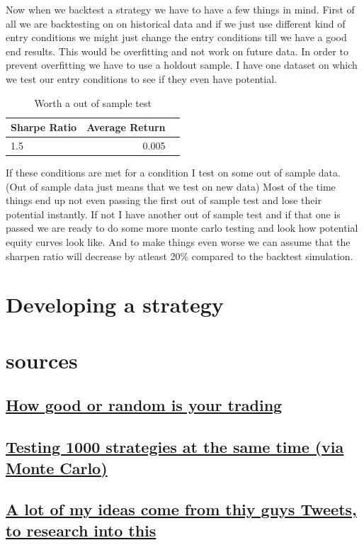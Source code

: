 \documentclass[12pt]{article}
\begin{document}
Now when we backtest a strategy we have to have a few things in mind. First of all we are backtesting on on historical data and if we just use different kind of entry conditions we might just change the entry conditions till we have a good end results. This would be overfitting and not work on future data. 
In order to prevent overfitting we have to use a holdout sample. I have one dataset on which we test our entry conditions to see if they even have potential. 



\begin{table}[H]
  \centering
  \caption{Worth a out of sample test}
  \label{tab:strategy_results}
  \begin{tabular}{@{}lrr@{}}
    \toprule
      Sharpe Ratio &  Average Return  \\
    \midrule
      1.5 & 0.005 \\
    \bottomrule
  \end{tabular}
\end{table}

If these conditions are met for a condition I test on some out of sample data. (Out of sample data just means that we test on new data)
Most of the time things end up not even passing the first out of sample test and lose their potential instantly. If not I have another out of sample test and if that one is passed we are ready to do some more monte carlo testing and look how potential equity curves look like.
And to make things even worse we can assume that the sharpen ratio will decrease by atleast 20\% compared to the backtest simulation.




\newpage
\section*{Developing a strategy}


\newpage
\section*{sources}
\subsection*{\href{https://x.com/HangukQuant/status/1930603876069335120}{How good or random is your trading}}
\subsection*{\href{https://github.com/polakowo/vectorbt}{Testing 1000 strategies at the same time (via Monte Carlo)}}
\subsection*{\href{https://x.com/abetrade/status/1941613701150188008}{ A lot of my ideas come from thiy guys Tweets, to research into this}}
\end{document}

